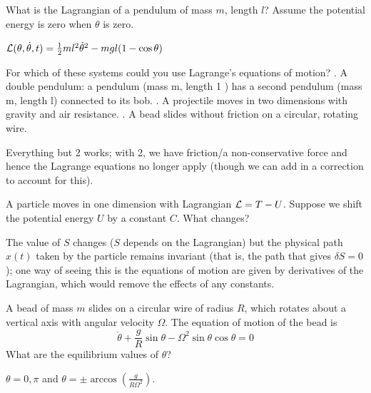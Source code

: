 \begin{p}
What is the Lagrangian of a pendulum of mass $m$, length $l$? Assume the potential energy is zero when $\theta$ is zero.
\end{p}
\begin{s}
$\mathcal{L}(\theta, \dot{\theta}, t) = \frac{1}{2}ml^2\dot{\theta}^2 - mgl(1-\cos\theta)$
\end{s}

\begin{p}
For which of these systems could you use Lagrange's equations of motion?
. A double pendulum: a pendulum (mass $\mathrm{m}$, length 1 ) has a second pendulum (mass $\mathrm{m}$, length l) connected to its bob.
. A projectile moves in two dimensions with gravity and air resistance.
. A bead slides without friction on a circular, rotating wire.
\end{p}
\begin{s}
Everything but 2 works; with 2, we have friction/a non-conservative force and hence the Lagrange equations no longer apply (though we can add in a correction to account for this).
\end{s}

\begin{p}
A particle moves in one dimension with Lagrangian $\mathcal{L} = T - U$. Suppose we shift the potential energy $U$ by a constant $C$. What changes?
\end{p}
\begin{s}
The value of $S$ changes ($S$ depends on the Lagrangian) but the physical path $x(t)$ taken by the particle remains invariant (that is, the path that gives $\delta S = 0$); one way of seeing this is the equations of motion are given by derivatives of the Lagrangian, which would remove the effects of any constants.
\end{s}

\begin{p}
A bead of mass $m$ slides on a circular wire of radius $R$, which rotates about a vertical axis with angular velocity $\Omega$. The equation of motion of the bead is \[\ddot{\theta} + \frac{g}{R}\sin\theta - \Omega^2\sin\theta\cos\theta = 0\]
What are the equilibrium values of $\theta$?
\end{p}
\begin{s}
$\theta = 0,\pi$ and $\theta = \pm\arccos(\frac{g}{R\Omega^2})$.
\end{s}

